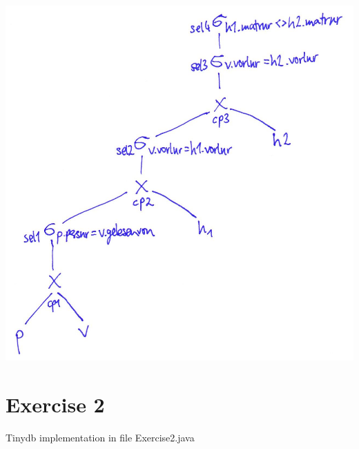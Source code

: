 \documentclass[11pt,a4paper]{scrartcl}
\begin{document}
\includegraphics[scale=1]{part2b.jpg}


\section*{Exercise 2}
Tinydb implementation in file Exercise2.java
\end{document}
